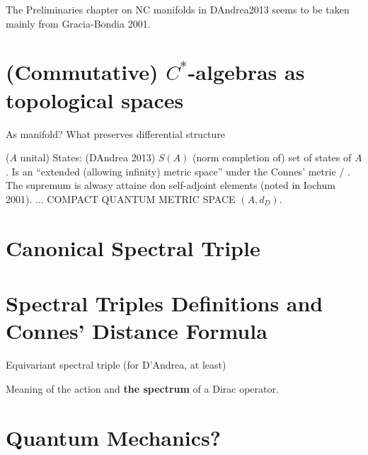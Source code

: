 The Preliminaries chapter on NC manifolds in DAndrea2013 seems to be taken mainly from Gracia-Bondia 2001.

\section{(Commutative) $C^*$-algebras as topological spaces}

As manifold? What preserves differential structure

($A$ unital) States: (DAndrea 2013) $S(A)$ (norm completion of) set of states of $A$. Is an ``extended (allowing infinity) metric space'' under the Connes' metric / . The supremum is alwasy attaine don self-adjoint elements (noted in Iochum 2001). ... COMPACT QUANTUM METRIC SPACE $(A,  d_{D})$.

\section{Canonical Spectral Triple}

\section{Spectral Triples Definitions and Connes' Distance Formula}

Equivariant spectral triple (for D'Andrea, at least)

Meaning of the action and \textbf{the spectrum} of a Dirac operator.

\section{Quantum Mechanics?}